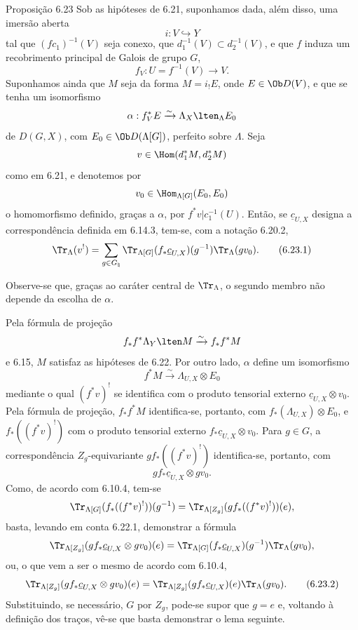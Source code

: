 \begin{statement}{Proposição 6.23}
Sob as hipóteses de 6.21, suponhamos dada, além disso, uma imersão aberta
\[
i:V\hookrightarrow Y
\]
tal que $(fc_1)^{-1}(V)$ seja conexo, que $d_1^{-1}(V)\subset d_2^{-1}(V)$, e que $f$ induza um recobrimento principal de Galois de grupo $G$,
\[
f_V:U=f^{-1}(V)\to V.
\]
Suponhamos ainda que $M$ seja da forma $M=i_!E$, onde $E\in\Ob D(V)$, e que se tenha um isomorfismo
\[
\alpha:f_V^*E\xrightarrow{\sim}\Lambda_X\lten_{\Lambda}E_0
\]
de $D(G,X)$, com $E_0\in\Ob D(\Lambda[G])$, perfeito sobre $\Lambda$. Seja
\[
v\in\Hom(d_1^*M,d_2^*M)
\]
como em 6.21, e denotemos por
\[
v_0\in\Hom_{\Lambda[G]}(E_0,E_0)
\]
o homomorfismo definido, graças a $\alpha$, por $f^*v|c_1^{-1}(U)$. Então, se $\underline c_{U,X}$ designa a correspondência definida em 6.14.3, tem-se, com a notação 6.20.2,
\begin{equation}
\Tr_{\Lambda}(v^!)
=
\sum_{g\in G_{\natural}}
\Tr_{\Lambda[G]}(f_*\underline c_{U,X})(g^{-1})\Tr_{\Lambda}(gv_0).
\tag{6.23.1}
\end{equation}
\end{statement}

Observe-se que, graças ao caráter central de $\Tr_{\Lambda}$, o segundo membro não depende da escolha de $\alpha$.

Pela fórmula de projeção
\[
f_*f^*\Lambda_Y\lten M\xrightarrow{\sim}f_*f^*M
\]
e 6.15, $M$ satisfaz as hipóteses de 6.22. Por outro lado, $\alpha$ define um isomorfismo
\[
f^*M\xrightarrow{\sim}\Lambda_{U,X}\otimes E_0
\]
mediante o qual $(f^*v)^!$ se identifica com o produto tensorial externo $\underline c_{U,X}\otimes v_0$. Pela fórmula de projeção, $f_*f^*M$ identifica-se, portanto, com $f_*(\Lambda_{U,X})\otimes E_0$, e $f_*((f^*v)^!)$ com o produto tensorial externo $f_*\underline c_{U,X}\otimes v_0$. Para $g\in G$, a correspondência $Z_g$-equivariante $gf_*((f^*v)^!)$ identifica-se, portanto, com
\[
gf_*\underline c_{U,X}\otimes gv_0.
\]
Como, de acordo com 6.10.4, tem-se
\[
\Tr_{\Lambda[G]}(f_*((f^*v)^!))(g^{-1})
=
\Tr_{\Lambda[Z_g]}(gf_*((f^*v)^!))(e),
\]
basta, levando em conta 6.22.1, demonstrar a fórmula
\[
\Tr_{\Lambda[Z_g]}(gf_*\underline c_{U,X}\otimes gv_0)(e)
=
\Tr_{\Lambda[G]}(f_*\underline c_{U,X})(g^{-1})\Tr_{\Lambda}(gv_0),
\]
ou, o que vem a ser o mesmo de acordo com 6.10.4,
\begin{equation}
\Tr_{\Lambda[Z_g]}(gf_*\underline c_{U,X}\otimes gv_0)(e)
=
\Tr_{\Lambda[Z_g]}(gf_*\underline c_{U,X})(e)\Tr_{\Lambda}(gv_0).
\tag{6.23.2}
\end{equation}
Substituindo, se necessário, $G$ por $Z_g$, pode-se supor que $g=e$ e, voltando à definição dos traços, vê-se que basta demonstrar o lema seguinte.
